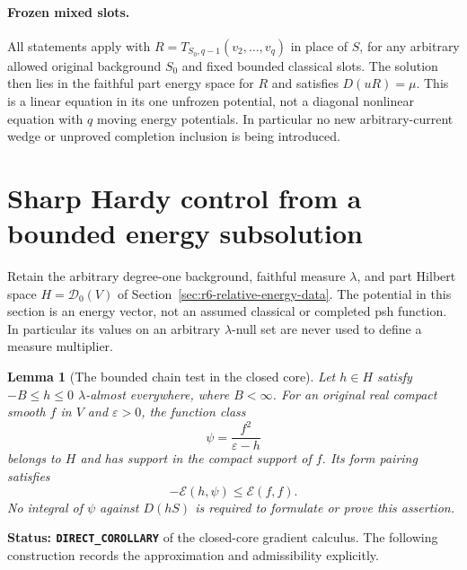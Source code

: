 \documentclass[11pt,a4paper]{article}
\numberwithin{equation}{section}
\newtheorem{lemma}[theorem]{Lemma}
\theoremstyle{definition}
\theoremstyle{remark}
\begin{document}
\paragraph{Frozen mixed slots.}
All statements apply with
$R=T_{S_0,q-1}(v_2,\ldots,v_q)$ in place of $S$, for any arbitrary
allowed original background $S_0$ and fixed bounded classical slots.
The solution then lies in the faithful part energy space for $R$ and
satisfies $D(uR)=\mu$. This is a linear equation in its one unfrozen
potential, not a diagonal nonlinear equation with $q$ moving energy
potentials. In particular no new arbitrary-current wedge or unproved
completion inclusion is being introduced.



\section{Sharp Hardy control from a bounded energy subsolution}
\label{sec:r6-energy-subsolution-hardy}

Retain the arbitrary degree-one background, faithful measure $\lambda$,
and part Hilbert space $H=\mathscr D_0(V)$ of
Section~\ref{sec:r6-relative-energy-data}. The potential in this section
is an energy vector, not an assumed classical or completed psh
function. In particular its values on an arbitrary $\lambda$-null set
are never used to define a measure multiplier.

\begin{lemma}[The bounded chain test in the closed core]
\label{lem:r6-energy-reciprocal-test}
Let $h\in H$ satisfy $-B\le h\le0$ $\lambda$-almost everywhere,
where $B<\infty$. For an original real compact smooth $f$ in $V$
and $\varepsilon>0$, the function class
\[
                        \psi=\frac{f^2}{\varepsilon-h}
\]
belongs to $H$ and has support in the compact support of $f$.
Its form pairing satisfies
\begin{equation}
                       -\mathcal E(h,\psi)\le\mathcal E(f,f).
 \label{eq:r6-closed-core-picone}
\end{equation}
No integral of $\psi$ against $D(hS)$ is required to formulate or
prove this assertion.
\end{lemma}

\noindent\textbf{Status: \texttt{DIRECT\_COROLLARY}} of the
closed-core gradient calculus. The following construction records the
approximation and admissibility explicitly.
\end{document}
